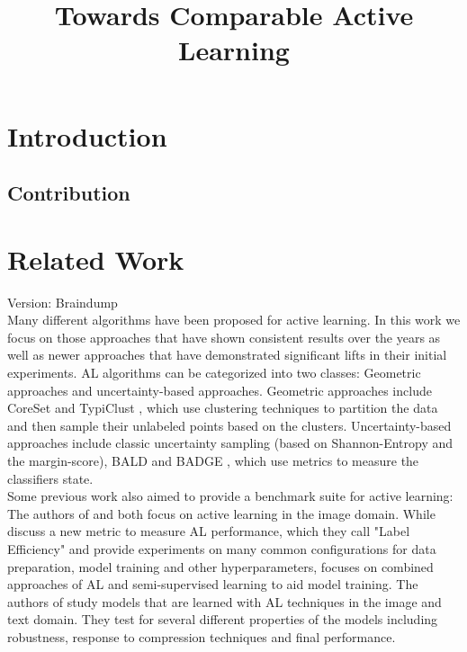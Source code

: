\documentclass[]{article}
\title{Towards Comparable Active Learning}
\begin{document}
\maketitle

\section{Introduction}


\subsection{Contribution}

\section{Related Work}
{\color{red} Version: Braindump}\\
Many different algorithms have been proposed for active learning. 
In this work we focus on those approaches that have shown consistent results over the years as well as newer approaches that have demonstrated significant lifts in their initial experiments.
AL algorithms can be categorized into two classes: Geometric approaches and uncertainty-based approaches.
Geometric approaches include CoreSet \cite{sener2017active} and TypiClust \cite{hacohen2022active}, which use clustering techniques to partition the data and then sample their unlabeled points based on the clusters.
Uncertainty-based approaches include classic uncertainty sampling (based on Shannon-Entropy and the margin-score), BALD \cite{kirsch2019batchbald} and BADGE \cite{ashdeep}, which use metrics to measure the classifiers state. \\ [1mm]
%
Some previous work also aimed to provide a benchmark suite for active learning:
The authors of \cite{beck2021effective} and \cite{li2022empirical} both focus on active learning in the image domain.
While \cite{beck2021effective} discuss a new metric to measure AL performance, which they call "Label Efficiency" and provide experiments on many common configurations for data preparation, model training and other hyperparameters, \cite{li2022empirical} focuses on combined approaches of AL and semi-supervised learning to aid model training.
The authors of \cite{hu2021towards} study models that are learned with AL techniques in the image and text domain.
They test for several different properties of the models including robustness, response to compression techniques and final performance.
\end{document}
